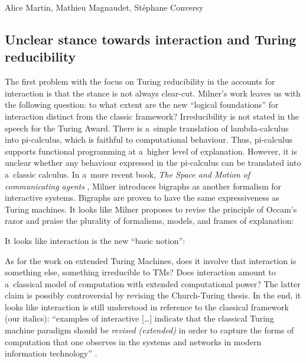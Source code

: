 \begin{artengenv2auth}{Alice Martin, Mathieu Magnaudet, Stéphane Conversy}
\subsection{Unclear stance towards interaction and Turing reducibility} 

The first problem with the focus on Turing reducibility in the accounts for interaction is that the stance is not always clear-cut. 
Milner’s work leaves us with the following question: to what extent are the new ``logical foundations'' for interaction distinct from the classic framework? Irreducibility is not stated in the speech for the Turing Award. There is a~simple translation of lambda-calculus into pi-calculus, which is faithful to computational behaviour. Thus, pi-calculus supports functional programming at a~higher level of explanation. However, it is unclear whether any behaviour expressed in the pi-calculus can be translated into a~classic calculus. In a~more recent book, \textit{The Space and Motion of communicating agents} \parencite*{Milner2009}, Milner introduces bigraphs as another formalism for interactive systems. Bigraphs are proven to have the same expressiveness as Turing machines. It looks like Milner proposes to revise the principle of Occam’s razor and praise the plurality of formalisms, models, and frames of explanation: 

\noindent It looks like interaction is the new ``basic notion'': 

As for the work on extended Turing Machines, does it involve that interaction is something else, something irreducible to TMs? Does interaction amount to a~classical model of computation with extended computational power? The latter claim is possibly controversial by revising the Church-Turing thesis. In the end, it looks like interaction is still understood in reference to the classical framework (our italics):  ``examples of interactive [\ldots] indicate that the classical Turing machine paradigm should be \textit{revised (extended)} in order to capture the forms of computation that one observes in the systems and networks in modern information technology'' \parencite{VanLeeuwen2000}. 


\end{artengenv2auth}
